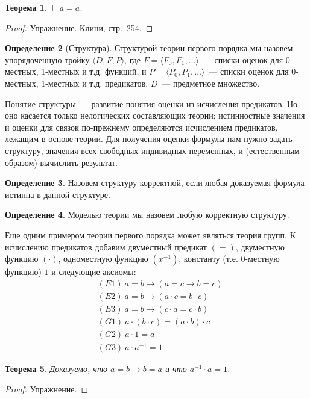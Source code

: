 \documentclass[a4paper,11pt]{article}
\newtheorem{thm}{Теорема}[section]
\theoremstyle{definition}
\newtheorem{dfn}[thm]{Определение}
\newcommand{\proves}{\vdash}
\begin{document}
\begin{thm}
$\proves a = a$.
\end{thm}
\begin{proof}
Упражнение. Клини, стр.~254.
\end{proof}

\begin{dfn}[Структура]
Структурой теории первого порядка мы назовем упорядоченную тройку $\langle D, F,
P\rangle$, где $F = \langle F_0, F_1, \dots\rangle$~--- списки оценок для
0-местных, 1-местных и т.д. функций, и $P = \langle P_0, P_1, \dots\rangle$~---
списки оценок для 0-местных, 1-местных и т.д. предикатов, $D$~--- предметное
множество.
\end{dfn}

Понятие структуры~--- развитие понятия оценки из исчисления предикатов. Но оно
касается только нелогических составляющих теории; истинностные значения и оценки
для связок по-прежнему определяются исчислением предикатов, лежащим в основе
теории. Для получения оценки формулы нам нужно задать структуру, значения всех
свободных индивидных переменных, и (естественным образом) вычислить результат.

\begin{dfn}
Назовем структуру корректной, если любая доказуемая формула истинна в данной
структуре.
\end{dfn}

\begin{dfn}
Моделью теории мы назовем любую корректную структуру.
\end{dfn}

Еще одним примером теории первого порядка может являться теория групп. К
исчислению предикатов добавим двуместный предикат $(=)$, двуместную функцию
$(\cdot)$, одноместную функцию $(x^{-1})$, константу (т.е. 0-местную функцию)
$1$ и следующие аксиомы:
\begin{align*}
&(E1)\ a = b \to (a = c \to b = c)\\
&(E2)\ a = b \to (a \cdot c = b \cdot c)\\
&(E3)\ a = b \to (c \cdot a = c \cdot b)\\
&(G1)\ a \cdot (b \cdot c) = (a \cdot b) \cdot c\\
&(G2)\ a \cdot 1 = a\\
&(G3)\ a \cdot a^{-1} = 1
\end{align*}

\begin{thm}
Доказуемо, что $a = b \to b = a$ и что $a^{-1} \cdot a = 1$.
\end{thm}
\begin{proof}
Упражнение.
\end{proof}
\end{document}
